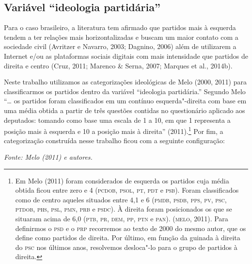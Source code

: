 \subsection{Variável ``ideologia partidária''}

Para o caso brasileiro, a literatura tem afirmado que partidos mais à
esquerda tendem a ter relações mais horizontalizadas e buscam um maior
contato com a sociedade civil (Avritzer e Navarro, 2003; Dagnino, 2006)
além de utilizarem a Internet e/ou as plataformas sociais digitais com
mais intensidade que partidos de direita e centro (Cruz, 2011; Marenco
\& Serna, 2007; Marques et al., 2014b).

Neste trabalho utilizamos as categorizações ideológicas de Melo (2000,
2011) para classificarmos os partidos dentro da variável ``ideologia
partidária.'' Segundo Melo ``\ldots{} os partidos foram classificados em um
contínuo esquerda"-direita com base em uma média obtida a partir de três
questões contidas no questionário aplicado aos deputados: tomando como
base uma escala de 1 a 10, em que 1 representa a posição mais à esquerda
e 10 a posição mais à direita'' (2011).\footnote{Em Melo (2011) foram
  considerados de esquerda os partidos cuja média obtida ficou entre
  zero e 4 (\textsc{pcdob}, \textsc{psol}, \textsc{pt}, \textsc{pdt} e \textsc{psb}). Foram classificados como de
  centro aqueles situados entre 4,1 e 6 (\textsc{pmdb}, \textsc{psdb}, \textsc{pps}, \textsc{pv}, \textsc{psc},
  \textsc{ptdob}, \textsc{phs}, \textsc{psl}, \textsc{pmn}, \textsc{prb} e \textsc{psdc}). À direita foram posicionados os que
  se situaram acima de 6,0 (\textsc{ptb}, \textsc{pr}, \textsc{dem}, \textsc{pp}, \textsc{ptn} e \textsc{pan}). (\textsc{melo}, 2011).
  Para definirmos o \textsc{psd} e o \textsc{prp} recorremos ao texto de 2000 do mesmo
  autor, que os define como partidos de direita. Por último, em função
  da guinada à direita do \textsc{psc} nos últimos anos, resolvemos desloca"-lo
  para o grupo de partidos à direita.} Por fim, a categorização
construída nesse trabalho ficou com a seguinte configuração:

\begin{center}

{\footnotesize\emph{Fonte: Melo (2011) e autores.}}
\end{center}

